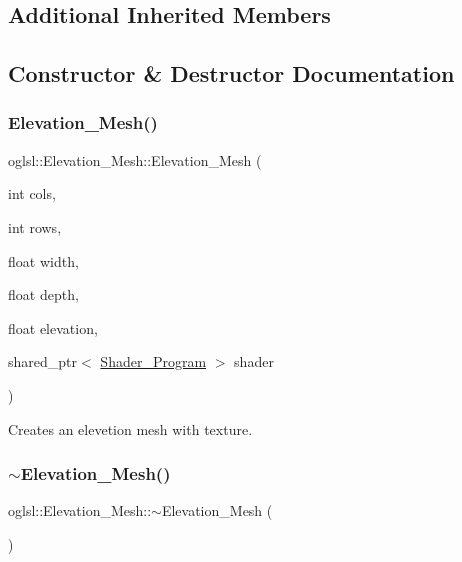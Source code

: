 \subsection*{Additional Inherited Members}


\subsection{Constructor \& Destructor Documentation}
\mbox{\label{classoglsl_1_1_elevation___mesh_ab23733c3bcec54943bb012c272a44ca3}} 
\subsubsection{\texorpdfstring{Elevation\+\_\+\+Mesh()}{Elevation\_Mesh()}}
{\footnotesize\ttfamily oglsl\+::\+Elevation\+\_\+\+Mesh\+::\+Elevation\+\_\+\+Mesh (\begin{DoxyParamCaption}\item[{int}]{cols,  }\item[{int}]{rows,  }\item[{float}]{width,  }\item[{float}]{depth,  }\item[{float}]{elevation,  }\item[{shared\+\_\+ptr$<$ \mbox{\hyperlink{classoglsl_1_1_shader___program}{Shader\+\_\+\+Program}} $>$}]{shader }\end{DoxyParamCaption})}



Creates an elevetion mesh with texture. 

\mbox{\label{classoglsl_1_1_elevation___mesh_afc3f5227d96a854e9e66723fbf728cb2}} 
\subsubsection{\texorpdfstring{$\sim$\+Elevation\+\_\+\+Mesh()}{~Elevation\_Mesh()}}
{\footnotesize\ttfamily oglsl\+::\+Elevation\+\_\+\+Mesh\+::$\sim$\+Elevation\+\_\+\+Mesh (\begin{DoxyParamCaption}{ }\end{DoxyParamCaption})}



